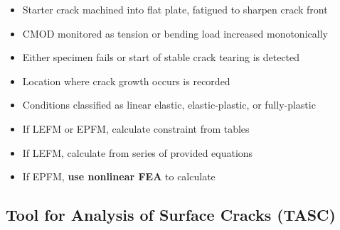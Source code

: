 \begin{frame}
\begin{itemize}
\item Starter crack machined into flat plate, fatigued to sharpen crack front
\item CMOD monitored as tension or bending load increased monotonically
\item Either specimen fails or start of stable crack tearing is detected
\item Location where crack growth occurs is recorded
\item Conditions classified as linear elastic, elastic-plastic, or fully-plastic
\item If LEFM or EPFM, calculate constraint from tables
\item If LEFM, calculate \K from series of provided equations
\item If EPFM, {\bfseries use nonlinear FEA} to calculate \J
\end{itemize}
\note{
\vfill
}
\end{frame}

\subsection{Tool for Analysis of Surface Cracks (TASC)}

